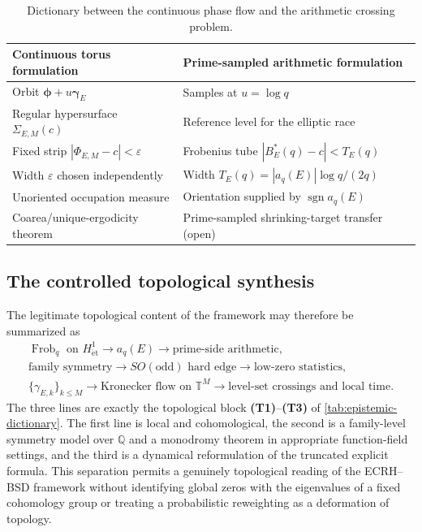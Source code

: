 \documentclass[11pt,reqno]{amsart}
\theoremstyle{remark}
\newcommand{\Q}{\mathbb{Q}}
\newcommand{\T}{\mathbb{T}}
\begin{document}
\begin{table}[H]
\centering
\small
\caption{Dictionary between the continuous phase flow and the arithmetic crossing problem.}
\label{tab:topology-crossing-dictionary}
\begin{tabularx}{\textwidth}{@{}P{4.7cm}>{\raggedright\arraybackslash}X@{}}
\toprule
Continuous torus formulation & Prime-sampled arithmetic formulation \\
\midrule
Orbit $\boldsymbol\phi+u\boldsymbol\gamma_E$ & Samples at $u=\log q$ \\
Regular hypersurface $\Sigma_{E,M}(c)$ & Reference level for the elliptic race \\
Fixed strip $|\Phi_{E,M}-c|<\varepsilon$ & Frobenius tube $|B_E^*(q)-c|<T_E(q)$ \\
Width $\varepsilon$ chosen independently & Width $T_E(q)=|a_q(E)|\log q/(2q)$ \\
Unoriented occupation measure & Orientation supplied by $\operatorname{sgn}a_q(E)$ \\
Coarea/unique-ergodicity theorem & Prime-sampled shrinking-target transfer (open) \\
\bottomrule
\end{tabularx}
\end{table}

\subsection{The controlled topological synthesis}
\label{subsec:topological-synthesis}

The legitimate topological content of the framework may therefore be summarized as
\begin{equation}
  \boxed{
  \begin{gathered}
  \operatorname{Frob}_q\text{ on }H^1_{\mathrm{\acute et}}
  \longrightarrow a_q(E)
  \longrightarrow\text{prime-side arithmetic},\\
  \text{family symmetry}
  \longrightarrow SO(\mathrm{odd})\text{ hard edge}
  \longrightarrow\text{low-zero statistics},\\
  \{\gamma_{E,k}\}_{k\le M}
  \longrightarrow\text{Kronecker flow on }\T^M
  \longrightarrow\text{level-set crossings and local time}.
  \end{gathered}}
  \label{eq:topological-synthesis}
\end{equation}
The three lines are exactly the topological block \textbf{(T1)}--\textbf{(T3)} of \cref{tab:epistemic-dictionary}.  The first line is local and cohomological, the second is a family-level symmetry model over $\Q$ and a monodromy theorem in appropriate function-field settings, and the third is a dynamical reformulation of the truncated explicit formula.  This separation permits a genuinely topological reading of the ECRH--BSD framework without identifying global zeros with the eigenvalues of a fixed cohomology group or treating a probabilistic reweighting as a deformation of topology.
\end{document}
